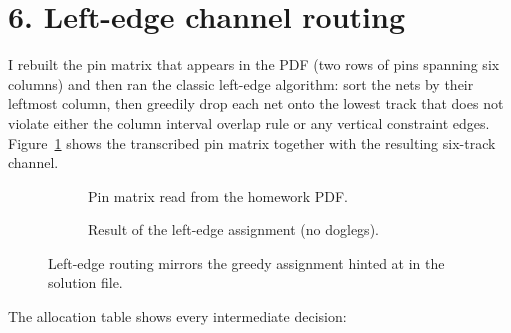 \documentclass[11pt]{article}
\begin{document}
\section*{6. Left-edge channel routing}
I rebuilt the pin matrix that appears in the PDF (two rows of pins spanning six columns) and then ran the classic left-edge algorithm: sort the nets by their leftmost column, then greedily drop each net onto the lowest track that does not violate either the column interval overlap rule or any vertical constraint edges. Figure~\ref{fig:left-edge} shows the transcribed pin matrix together with the resulting six-track channel.
\begin{figure}[h]
  \centering
  \begin{subfigure}{0.48\linewidth}
    \centering
    \caption{Pin matrix read from the homework PDF.}
  \end{subfigure}
  \begin{subfigure}{0.48\linewidth}
    \centering
    \caption{Result of the left-edge assignment (no doglegs).}
  \end{subfigure}
  \caption{Left-edge routing mirrors the greedy assignment hinted at in the solution file.\label{fig:left-edge}}
\end{figure}
The allocation table shows every intermediate decision:
\end{document}
